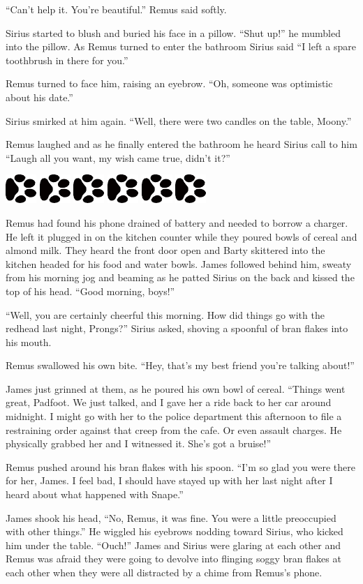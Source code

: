\documentclass[12pt,twoside,openright]{memoir}
\newcommand{\dogPrintRule}{	
	\begin{center}
		\hspace{.5em}
		\includegraphics[angle=60]{dogprint.pdf}
		\hspace{.5em}
		\includegraphics[angle=120]{dogprint.pdf}
		\hspace{.5em}
		\includegraphics[angle=60]{dogprint.pdf}
		\hspace{.5em}
		\includegraphics[angle=120]{dogprint.pdf}
		\hspace{.5em}
		\includegraphics[angle=60]{dogprint.pdf}
		\hspace{.5em}
		\includegraphics[angle=120]{dogprint.pdf}
		\hspace{.5em}
	\end{center}
}
\begin{document}
``Can't help it. You're beautiful.'' Remus said softly.

Sirius started to blush and buried his face in a pillow. ``Shut up!'' he mumbled into the pillow. As Remus turned to enter the bathroom Sirius said ``I left a spare toothbrush in there for you.''

Remus turned to face him, raising an eyebrow. ``Oh, someone was optimistic about his date.''

Sirius smirked at him again. ``Well, there were two candles on the table, Moony.''

Remus laughed and as he finally entered the bathroom he heard Sirius call to him ``Laugh all you want, my wish came true, didn't it?''

\dogPrintRule

Remus had found his phone drained of battery and needed to borrow a charger. He left it plugged in on the kitchen counter while they poured bowls of cereal and almond milk. They heard the front door open and Barty skittered into the kitchen headed for his food and water bowls. James followed behind him, sweaty from his morning jog and beaming as he patted Sirius on the back and kissed the top of his head. ``Good morning, boys!''

``Well, you are certainly cheerful this morning. How did things go with the redhead last night, Prongs?'' Sirius asked, shoving a spoonful of bran flakes into his mouth.

Remus swallowed his own bite. ``Hey, that's my best friend you're talking about!''

James just grinned at them, as he poured his own bowl of cereal. ``Things went great, Padfoot. We just talked, and I gave her a ride back to her car around midnight. I might go with her to the police department this afternoon to file a restraining order against that creep from the cafe. Or even assault charges. He physically grabbed her and I witnessed it. She's got a bruise!''

Remus pushed around his bran flakes with his spoon. ``I'm so glad you were there for her, James. I feel bad, I should have stayed up with her last night after I heard about what happened with Snape.''

James shook his head, ``No, Remus, it was fine. You were a little preoccupied with other things.'' He wiggled his eyebrows nodding toward Sirius, who kicked him under the table. ``Ouch!'' James and Sirius were glaring at each other and Remus was afraid they were going to devolve into flinging soggy bran flakes at each other when they were all distracted by a chime from Remus's phone.
\end{document}
